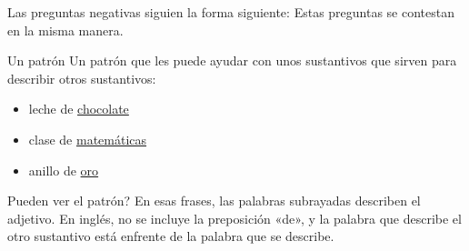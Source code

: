 Las preguntas negativas siguien la forma siguiente:
Estas preguntas se contestan en la misma manera.

\begin{conf}{Un patr\'on}
	Un patr\'on que les puede ayudar con unos sustantivos que sirven para describir otros sustantivos:
	\begin{itemize}
		\item leche de \underline{chocolate} \arr {}
		\item clase de \underline{matemáticas} \arr {}
		\item anillo de \underline{oro} \arr {}
	\end{itemize}

	\textquestiondown Pueden ver el patr\'on?
	En esas frases, las palabras subrayadas describen el adjetivo.
	En ingl\'es, no se incluye la preposici\'on «de», y la palabra que describe el otro sustantivo está enfrente de
	la palabra que se describe.
\end{conf}
